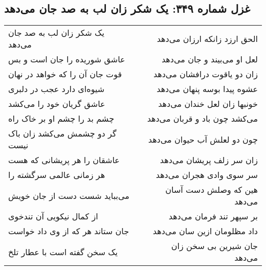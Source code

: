 \begin{center}
\section*{غزل شماره ۳۴۹: یک شکر زان لب به صد جان می‌دهد}
\label{sec:349}
\begin{longtable}{l p{0.5cm} r}
یک شکر زان لب به صد جان می‌دهد
&&
الحق ارزد زانکه ارزان می‌دهد
\\
عاشق شوریده را جان است و بس
&&
لعل او می‌بیند و جان می‌دهد
\\
قوت جان آن را که خواهد در نهان
&&
زان دو یاقوت درافشان می‌دهد
\\
شیوه‌ای دارد عجب در دلبری
&&
عشوه پیدا بوسه پنهان می‌دهد
\\
عاشق گریان خود را می‌کشد
&&
خونبها زان لعل خندان می‌دهد
\\
چشم بد را چشم او بر خاک راه
&&
می‌کشد چون باد و قربان می‌دهد
\\
گر دو چشمش می‌کشد زان باک نیست
&&
چون دو لعلش آب حیوان می‌دهد
\\
عاشقان را هر پریشانی که هست
&&
زان سر زلف پریشان می‌دهد
\\
هر زمانی عالمی سرگشته را
&&
سر سوی وادی هجران می‌دهد
\\
می‌بباید شست دست از جان خویش
&&
هین که وصلش دست آسان می‌دهد
\\
از کمال نیکویی آن تندخوی
&&
بر سپهر تند فرمان می‌دهد
\\
جان ستاند هر که از وی داد خواست
&&
داد مظلومان ازین سان می‌دهد
\\
یک سخن گفته است با عطار تلخ
&&
جان شیرین بی سخن زان می‌دهد
\\
\end{longtable}
\end{center}
